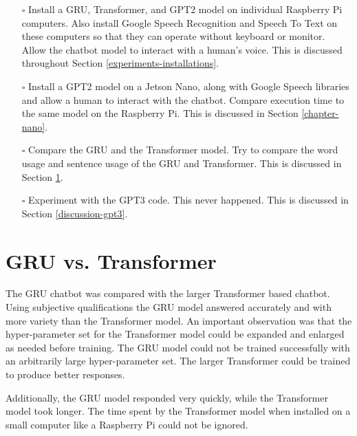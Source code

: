 \begin{itemize}
	\item[\rlap{\raisebox{0.3ex}{\hspace{0.4ex}\tiny \ding{52}}}$\square$] Install a GRU, Transformer, and GPT2 model on individual Raspberry Pi computers. Also install Google Speech Recognition and Speech To Text on these computers so that they can operate without keyboard or monitor. Allow the chatbot model to interact with a human's voice. This is discussed throughout Section \ref{experiments-installations}.
	\item[\rlap{\raisebox{0.3ex}{\hspace{0.4ex}\tiny \ding{52}}}$\square$] Install a GPT2 model on a Jetson Nano, along with Google Speech libraries and allow a human to interact with the chatbot. Compare execution time to the same model on the Raspberry Pi. This is discussed in Section \ref{chapter-nano}.
	\item[\rlap{\raisebox{0.3ex}{\hspace{0.4ex}\tiny \ding{52}}}$\square$] Compare the GRU and the Transformer model. Try to compare the word usage and sentence usage of the GRU and Transformer. This is discussed in Section \ref{gru-vs-transformer}.
	\item[\rlap{\raisebox{0.3ex}{\hspace{0.4ex}\scriptsize \ding{56}}}$\square$] Experiment with the GPT3 code. This never happened. This is discussed in Section \ref{discussion-gpt3}.
\end{itemize}


\section{GRU vs. Transformer}
\label{gru-vs-transformer}

The GRU chatbot was compared with the larger Transformer based chatbot. Using subjective qualifications the GRU model answered accurately and with more variety than the Transformer model. An important observation was that the hyper-parameter set for the Transformer model could be expanded and enlarged as needed before training. The GRU model could not be trained successfully with an arbitrarily large hyper-parameter set. The larger Transformer could be trained to produce better responses.

Additionally, the GRU model responded very quickly, while the Transformer model took longer. The time spent by the Transformer model when installed on a small computer like a Raspberry Pi could not be ignored. 

